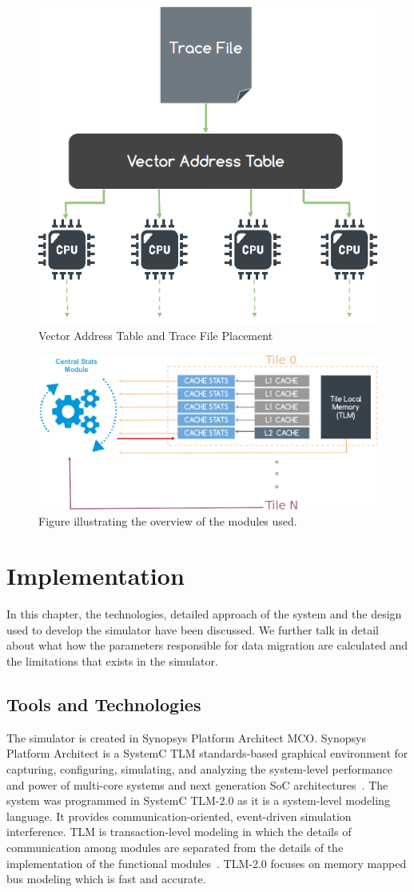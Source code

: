 \documentclass{listhesis}
\begin{document}
\begin{figure}[h!]
  \includegraphics[width=0.7\linewidth]{traceFile.png}
  \centering
  \caption{Vector Address Table and Trace File Placement}
  \label{fig:traceFile}
\end{figure}

\begin{figure}
  \includegraphics[width=\linewidth]{moduleconnections.png}
  \centering
  \caption{Figure illustrating the overview of the modules used.}
  \label{fig:overviewOfSolution}
\end{figure}
\chapter{Implementation}
In this chapter, the technologies, detailed approach of the system and the design used to develop the simulator have been discussed. We further talk in detail about what how the parameters responsible for data migration are calculated and the limitations that exists in the simulator. 
\section{Tools and Technologies}
The simulator is created in Synopsys Platform Architect MCO. Synopsys Platform Architect is a SystemC TLM standards-based graphical environment for capturing, configuring, simulating, and analyzing the system-level performance and power of multi-core systems and next generation SoC architectures~\cite{synopsys}.
The system was programmed in SystemC TLM-2.0 as it is a system-level modeling language. It provides communication-oriented, event-driven simulation interference. TLM is transaction-level modeling in which the details of communication among modules are separated from the details of the implementation of the functional modules~\cite{tlm}. TLM-2.0 focuses on memory mapped bus modeling which is fast and accurate.
\end{document}

